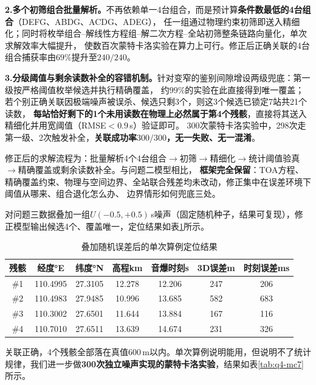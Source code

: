 \documentclass[draft,12pt,a4paper]{ctexart}
\theoremstyle{definition}
\begin{document}
\textbf{2.多个初筛组合批量解析。}不再依赖单一4台组合，而是预计算\textbf{条件数最低的4台组合}（DEFG、ABDG、ACDG、ADEG），
任一组通过物理约束初筛即送入精细化；同时将枚举组合--解线性方程组--解二次方程--全站初筛整条链路向量化，单次求解效率大幅提升，
使数百次蒙特卡洛实验在算力上可行。修正后正确关联的4台组合捕获率由$69\%$提升至\textbf{$240/240$}。

\textbf{3.分级阈值与剩余读数补全的容错机制。}针对变窄的鉴别间隙增设两级兜底：第一级按严格阈值枚举候选并执行精确覆盖，
约$99\%$的实验在此直接得到唯一覆盖；若个别正确关联因极端噪声被误杀、候选只剩3个，则这3个候选已锁定7站共21个读数，
\textbf{每站恰好剩下的1个未用读数在物理上必然属于第4个残骸}，直接将其送入精细化并用宽阈值（RMSE$<0.9$\,s）验证即可。
300次蒙特卡洛实验中，298次走第一级、2次触发补全，\textbf{关联成功率$300/300$，无一失败、无一混淆}。

修正后的求解流程为：批量解析4个4台组合$\to$初筛$\to$精细化$\to$统计阈值验真$\to$精确覆盖或剩余读数补全。与问题二模型相比，
\textbf{框架完全保留}：TOA方程、精确覆盖约束、物理与空间边界、全站联合残差均未改动，修正集中在误差环境下阈值从哪来、组合退化怎么办、
边界情形如何兜底三处。

对问题三数据叠加一组$U(-0.5,+0.5)$\,s噪声（固定随机种子，结果可复现），修正模型输出候选4个、覆盖唯一，定位结果如表\ref{tab:q4-single}所示。

\begin{table}[H]\centering
  \caption{叠加随机误差后的单次算例定位结果}\label{tab:q4-single}
  \small
  \begin{tabular}{ccccccc}
    \toprule
    \textbf{残骸} & \textbf{经度°E} & \textbf{纬度°N} & \textbf{高程km} & \textbf{音爆时刻s} & \textbf{3D误差m} & \textbf{时刻误差ms} \\
    \midrule
    \#1 & 110.4995 & 27.3105 & 12.278 & 12.206 & 247 & 206 \\
    \#2 & 110.4983 & 27.9485 & 10.996 & 13.685 & 582 & 683 \\
    \#3 & 110.3002 & 27.6501 & 11.644 & 13.884 & 167 & 116 \\
    \#4 & 110.7010 & 27.6511 & 13.639 & 14.674 & 231 & 326 \\
    \bottomrule
  \end{tabular}
\end{table}

关联正确，4个残骸全部落在真值$600$\,m以内。单次算例说明能用，但说明不了统计规律，我们进一步做\textbf{300次独立噪声实现的蒙特卡洛实验}，结果如表\ref{tab:q4-mc7}所示。
\end{document}
